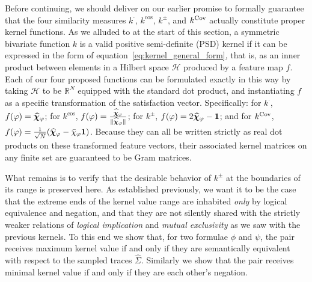 \documentclass[titlepage,a4paper,11pt]{report}
\begin{document}
    Before continuing, we should deliver on our earlier promise to formally guarantee that the four similarity measures $k^\cdot$, $k^{\cos}$, $k^\pm$, and $k^{\mathrm{Cov}}$ actually constitute proper kernel functions. As we alluded to at the start of this section, a symmetric bivariate function $k$ is a valid positive semi-definite (PSD) kernel if it can be expressed in the form of equation~\eqref{eq:kernel_general_form}, that is, as an inner product between elements in a Hilbert space $\mathcal{H}$ produced by a feature map $f$. Each of our four proposed functions can be formulated exactly in this way by taking $\mathcal{H}$ to be $\mathbb{R}^N$ equipped with the standard dot product, and instantiating $f$ as a specific transformation of the satisfaction vector. Specifically: for $k^\cdot$, $f(\varphi) = \bm{\widehat\chi}_\varphi$; for $k^{\cos}$, $f(\varphi) = \frac{\bm{\widehat\chi}_\varphi}{\Vert \bm{\widehat\chi}_\varphi \Vert}$; for $k^\pm$, $f(\varphi) = 2\bm{\widehat\chi}_\varphi - \mathbf{1}$; and for $k^{\mathrm{Cov}}$, $f(\varphi) = \frac{1}{\sqrt{N}} (\bm{\widehat\chi}_\varphi - \bar{\chi}_\varphi \mathbf{1})$. Because they can all be written strictly as real dot products on these transformed feature vectors, their associated kernel matrices on any finite set are guaranteed to be Gram matrices.
    
    What remains is to verify that the desirable behavior of $k^\pm$ at the boundaries of its range is preserved here. As established previously, we want it to be the case that the extreme ends of the kernel value range are inhabited \emph{only} by logical equivalence and negation, and that they are not silently shared with the strictly weaker relations of \emph{logical implication} and \emph{mutual exclusivity} as we saw with the previous kernels. To this end we show that, for two formulae $\phi$ and $\psi$, the pair receives maximum kernel value if and only if they are semantically equivalent with respect to the sampled traces $\widehat \Sigma$. Similarly we show that the pair receives minimal kernel value if and only if they are each other's negation.
\end{document}
